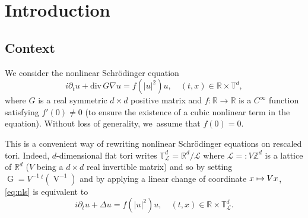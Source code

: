 \documentclass[JEP,XML,SOM,Unicode,published]{cedram}
\newcommand\mto{\mathchoice{\longmapsto}{\mapsto}{\mapsto}{\mapsto}}
\theoremstyle{plain}
\theoremstyle{definition}
\newcommand{\R}{\mathbb{R}}
\newcommand{\T}{\mathbb{T}}
\newcommand{\1}{\mathbf{1}}
\begin{document}
\maketitle

\tableofcontents

\mainmatter
\section{Introduction}

\subsection{Context}
We consider the nonlinear Schrödinger equation
\begin{equation}
\label{eq:nls}
\tag{NLS}
i\partial_{t}u + \mathrm{div} \, G \nabla u = f(|u|^{2})u,\quad (t,x)\in\R\times\mathbb{T}^{d},
\end{equation}
where $G$ is a real symmetric $d\times d$ positive matrix and $f:\R\to\R$ is a $C^\infty$ function satisfying $f'(0)\neq 0$ (to ensure the existence of a cubic nonlinear term in the equation). Without loss of generality, we~assume that $f(0)=0$.

This is a convenient way of rewriting nonlinear Schrödinger equations on rescaled tori. Indeed, $d$-dimensional flat tori writes $\mathbb{T}_{\mathscr{L}}^d= \R^d/\mathscr{L}$ where $\mathscr{L}=: V \mathbb{Z}^d$ is a lattice of $\R^d$ ($V$ being a $d\times d$ real invertible matrix) and so by setting $\operatorname{G} = V^{-1} \, ^{t}(\operatorname{V}^{-1})$ and by applying a linear change of coordinate $x\mto Vx$, \eqref{eq:nls} is equivalent to
\begin{equation*}
i\partial_tu + \Delta u = f(|u|^2)u,\quad (t,x)\in \R\times\T_{\mathscr{L}}^d.
\end{equation*}
\end{document}
